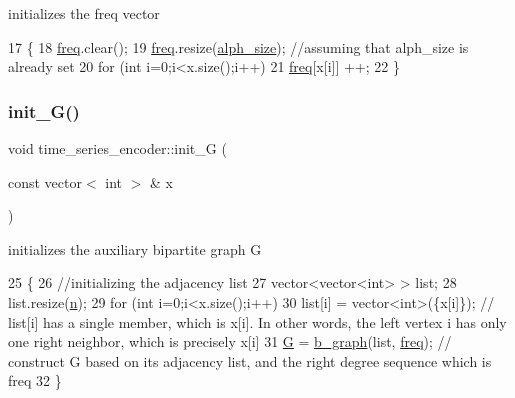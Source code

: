 initializes the freq vector 


\begin{DoxyCode}
17 \{
18   \hyperlink{classtime__series__encoder_ac6496aa39f28da4d8fe964c495e76057}{freq}.clear();
19   \hyperlink{classtime__series__encoder_ac6496aa39f28da4d8fe964c495e76057}{freq}.resize(\hyperlink{classtime__series__encoder_a7e73867e25ea5ae643bf05eaf33ea9ac}{alph\_size}); \textcolor{comment}{//assuming that alph\_size is already set}
20   \textcolor{keywordflow}{for} (\textcolor{keywordtype}{int} i=0;i<x.size();i++)
21     \hyperlink{classtime__series__encoder_ac6496aa39f28da4d8fe964c495e76057}{freq}[x[i]] ++;
22 \}
\end{DoxyCode}
\mbox{\label{classtime__series__encoder_a90eb54134d6af2ab2cca36ee13956470}} 
\subsubsection{\texorpdfstring{init\+\_\+\+G()}{init\_G()}}
{\footnotesize\ttfamily void time\+\_\+series\+\_\+encoder\+::init\+\_\+G (\begin{DoxyParamCaption}\item[{const vector$<$ int $>$ \&}]{x }\end{DoxyParamCaption})\hspace{0.3cm}{\ttfamily [private]}}



initializes the auxiliary bipartite graph G 


\begin{DoxyCode}
25 \{
26   \textcolor{comment}{//initializing the adjacency list}
27   vector<vector<int> > list;
28   list.resize(\hyperlink{classtime__series__encoder_ab84b7528d50c495fc140f1eb50d9b539}{n});
29   \textcolor{keywordflow}{for} (\textcolor{keywordtype}{int} i=0;i<x.size();i++)
30     list[i] = vector<int>(\{x[i]\}); \textcolor{comment}{// list[i] has a single member, which is x[i]. In other words, the left
       vertex i has only one right neighbor, which is precisely x[i]}
31   \hyperlink{classtime__series__encoder_aa40f761a56f696e78e8888e50e8f45b9}{G} = \hyperlink{classb__graph}{b\_graph}(list, \hyperlink{classtime__series__encoder_ac6496aa39f28da4d8fe964c495e76057}{freq}); \textcolor{comment}{// construct G based on its adjacency list, and the right degree
       sequence which is freq}
32 \}
\end{DoxyCode}


